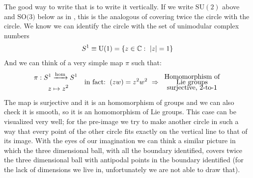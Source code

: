 \documentclass[../main.tex]{subfiles}
\begin{document}
The good way to write that is to write it vertically. If we write $\textrm{SU}(2)$ above and $\textrm{SO(3)}$ below as in , this is the analogous of covering twice the circle with the circle. We know we can identify the circle with the set of unimodular complex numbers
\[
S^1\equiv \textrm{U}(1)=\Bqty{z\in \mathbb{C}: \ \abs{z}=1}
\]
And we can think of a very simple map $\pi$ such that:
\[
\begin{split}
    \pi : S^1 &\xrightarrow[]{\textrm{hom}} S^1\\
    z &\mapsto z^2
\end{split}
\quad \textrm{in fact: } \left(zw\right)=z^2w^2 \ \Rightarrow \ \text{\parbox{3 cm}{\centering Homomorphism of \\[-4pt] Lie groups\\[-4pt] surjective, 2-to-1}}
\]
The map is surjective and it is an homomorphism of groups and we can also check it is smooth, so it is an homomorphism of Lie groups. This case can be visualized very well; for the pre-image we try to make another circle in such a way that every point of the other circle fits exactly on the vertical line to that of its image. With the eyes of our imagination we can think a similar picture in which the three dimensional ball, with all the boundary identified, covers twice the three dimensional ball with antipodal points in the boundary identified (for the lack of dimensions we live in, unfortunately we are not able to draw that).
\end{document}
